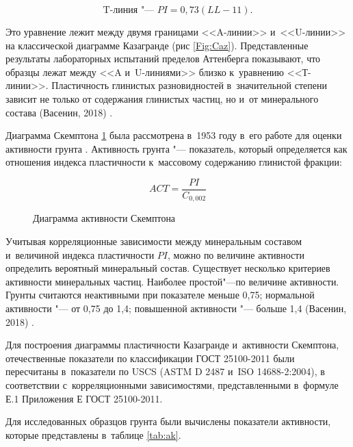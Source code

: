 \begin{equation}
    \label{eq:t}
    \text{T-линия "--- } PI = 0,73 (LL-11).
\end{equation}

Это уравнение лежит между двумя границами <<A-линии>> и~<<U-линии>> на классической диаграмме Казагранде (рис \ref{Fig:Caz}). Представленные результаты лабораторных испытаний пределов Аттенберга показывают, что образцы лежат между <<A и~U-линиями>> близко к~уравнению <<Т-линии>>. Пластичность глинистых разновидностей в~значительной степени зависит не только от содержания глинистых частиц, но и~от минерального состава (Васенин, 2018) \cite{vasenin2018}.

Диаграмма Скемптона \ref{Fig:Skt} была рассмотрена в~1953 году в~его работе для оценки активности грунта \cite{skempton1953}.
Активность грунта "--- показатель, который определяется как отношения индекса пластичности к~массовому содержанию глинистой фракции:

\begin{equation}
    \label{eq:act}
    ACT = \frac{PI}{C_{0,002}}
\end{equation}

\begin{figure}[ht]
    \centering
    \small
    
    \caption{Диаграмма активности Скемптона}
    \label{Fig:Skt}
  \end{figure}

Учитывая корреляционные зависимости между минеральным составом и~величиной индекса пластичности $PI$, можно по величине активности определить вероятный минеральный состав. Существует несколько критериев активности минеральных частиц. Наиболее простой"---по величине активности. 
Грунты считаются неактивными при показателе меньше 0,75; нормальной активности "--- от 0,75 до 1,4; повышенной активности "--- больше 1,4 (Васенин, 2018) \cite{vasenin2018}.


Для построения диаграммы пластичности Казагранде и~активности Скемптона, отечественные показатели по классификации ГОСТ 25100-2011 были пересчитаны в~показатели по USCS (ASTM D 2487 и~ISO 14688-2:2004), 
в соответствии с~корреляционными зависимостями, представленными в~формуле Е.1 Приложения Е ГОСТ 25100-2011.


Для исследованных образцов грунта были вычислены показатели активности, которые представлены в~таблице \ref{tab:ak}.

